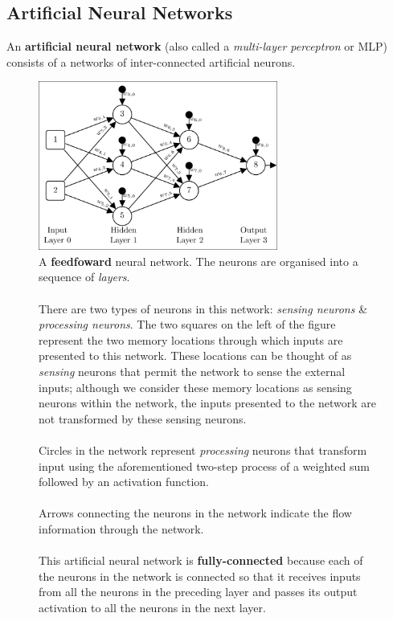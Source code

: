 \documentclass[a4paper,11pt]{article}
\begin{document}
\subsection{Artificial Neural Networks}
An \textbf{artificial neural network} (also called a \textit{multi-layer perceptron} or MLP) consists of a networks of inter-connected artificial neurons.

\begin{figure}[H]
    \centering
    \includegraphics[width=0.7\textwidth]{images/artificialneuralnetworks.png}
    \caption{
        A \textbf{feedfoward} neural network.
        The neurons are organised into a sequence of \textit{layers}.
        \\\\
        There are two types of neurons in this network: \textit{sensing neurons} \& \textit{processing neurons}.
        The two squares on the left of the figure represent the two memory locations through which inputs are presented to this network.
        These locations can be thought of as \textit{sensing} neurons that permit the network to sense the external inputs;
        although we consider these memory locations as sensing neurons within the network, the inputs presented to the network are not transformed by these sensing neurons.
        \\\\
        Circles in the network represent \textit{processing} neurons that transform input using the aforementioned two-step process of a weighted sum followed by an activation function.
        \\\\
        Arrows connecting the neurons in the network indicate the flow information through the network.
        \\\\
        This artificial neural network is \textbf{fully-connected} because each of the neurons in the network is connected so that it receives inputs from all the neurons in the preceding layer and passes its output activation to all the neurons in the next layer.
    }
\end{figure}
\end{document}

